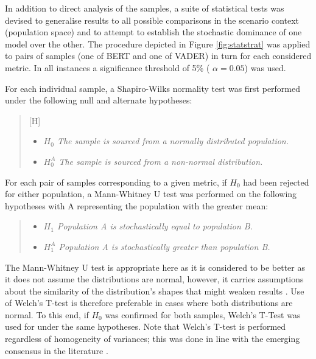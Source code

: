 \documentclass{csfourzero}
\begin{document}
In addition to direct analysis of the samples, a suite of statistical tests was devised to generalise results to all possible comparisons in the scenario context (population space) and to attempt to establish the stochastic dominance of one model over the other. The procedure depicted in Figure \ref{fig:statstrat} was applied to pairs of samples (one of BERT and one of VADER) in turn for each considered metric. In all instances a significance threshold of 5\% ( $\alpha=0.05$) was used.
\par
For each individual sample, a Shapiro-Wilks normality test was first performed under the following null and alternate hypotheses:
\par
\begin{quote}[H]
    \begin{center}
        \begin{itemize}
            \item\textit{$H_0$ The sample is sourced from a normally distributed population.}
            \item\textit{$H_{0}^A$ The sample is sourced from a non-normal distribution.}
        \end{itemize}
    \end{center}
\end{quote}
\par

For each pair of samples corresponding to a given metric, if $H_0$ had been rejected for either population, a Mann-Whitney U test was performed on the following hypotheses with A representing the population with the greater mean:

\par
\begin{quote}
    \begin{center}
        \begin{itemize}
            \item\textit{$H_{1}$ Population A is stochastically equal to population B.}
            \item\textit{$H_{1}^{A}$ Population A is stochastically greater than population B.}
        \end{itemize}
    \end{center}
\end{quote}
\par

The Mann-Whitney U test is appropriate here as it is considered to be better as it does not assume the distributions are normal, however, it carries assumptions about the similarity of the distribution's shapes that might weaken results \cite{mannwhitneyU}. Use of Welch's T-test is therefore preferable in cases where both distributions are normal. To this end, if $H_{0}$ was confirmed for both samples, Welch's T-Test was used for under the same hypotheses. Note that Welch's T-test is performed regardless of homogeneity of variances; this was done in line with the emerging consensus in the literature \cite{welchgood1}\cite{welchgood2}.
\end{document}
